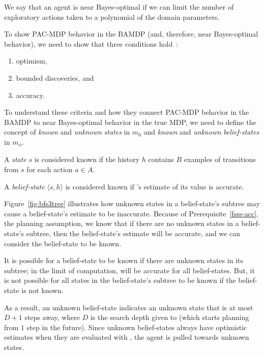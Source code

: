 We say that an agent is near Bayes-optimal if we can limit the number of exploratory actions taken to a polynomial of the domain parameters.

To show PAC-MDP behavior in the BAMDP (and, therefore, near Bayes-optimal behavior), we need to show that three conditions hold~\cite{lihong09pacmdp}:
\begin{enumerate}
\item \label{pacmdp-opt} optimism,
\item \label{pacmdp-disc} bounded discoveries, and
\item \label{pacmdp-acc} accuracy.
\end{enumerate}

To understand these criteria and how they connect PAC-MDP behavior in the BAMDP to near Bayes-optimal behavior in the true MDP, we need to define the concept of \emph{known} and \emph{unknown} \emph{states} in $m_0$ and  \emph{known} and \emph{unknown} \emph{belief-states} in $m_\phi$.

A \emph{state} $s$ is considered known if the history $h$ contains $B$ examples of transitions from $s$ for each action $a\in A$.

A \emph{belief-state} $\langle s, h \rangle$ is considered known if 's estimate of its value is accurate.

Figure~\ref{fig:bfs3tree} illustrates how unknown states in a belief-state's  subtree may cause a belief-state's estimate to be inaccurate. Because of Prerequisite~\ref{fsss-acc}, the planning assumption, we know that if there are no unknown states in a belief-state's subtree, then the belief-state's estimate will be accurate, and we can consider the belief-state to be known.

It is possible for a belief-state to be known if there are unknown states in its subtree; in the limit of computation,  will be accurate for all belief-states. But, it is not possible for all states in the belief-state's subtree to be known if the belief-state is not known.

As a result, an unknown belief-state indicates an unknown state that is at most $D+1$ steps away, where $D$ is the search depth given to  (which starts planning from $1$ step in the future). Since unknown belief-states always have optimistic estimates when they are evaluated with , the agent is pulled towards unknown states.

